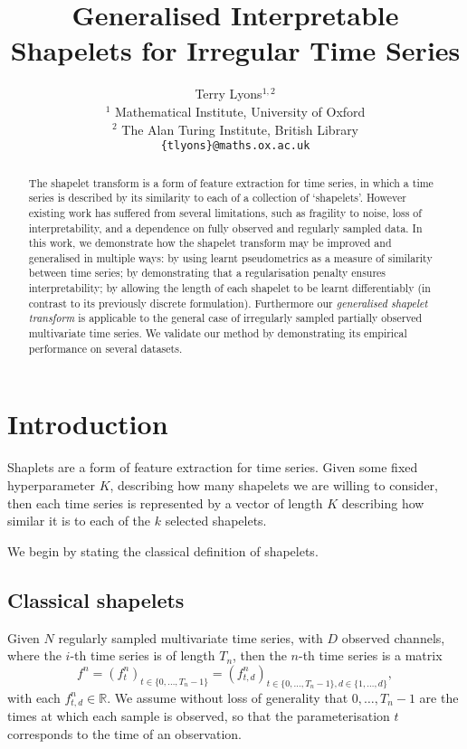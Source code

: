 \documentclass{article}
\title{Generalised Interpretable Shapelets for Irregular Time Series}
\author{
	\And
	Terry Lyons$^{1, 2}$
	\AND \\[-12pt]
	\null$^1$ Mathematical Institute, University of Oxford \\
	\null$^2$ The Alan Turing Institute, British Library \\
	\texttt{\{tlyons\}@\hspace{0.1pt}maths.ox.ac.uk}
}
\theoremstyle{plain}
\theoremstyle{definition}
\newcommand{\reals}{\mathbb{R}}
\begin{document}
	\maketitle
	\begin{abstract}
		The shapelet transform is a form of feature extraction for time series, in which a time series is described by its similarity to each of a collection of `shapelets'. However existing work has suffered from several limitations, such as fragility to noise, loss of interpretability, and a dependence on fully observed and regularly sampled data. In this work, we demonstrate how the shapelet transform may be improved and generalised in multiple ways: by using learnt pseudometrics as a measure of similarity between time series; by demonstrating that a regularisation penalty ensures interpretability; by allowing the length of each shapelet to be learnt differentiably (in contrast to its previously discrete formulation). Furthermore our \emph{generalised shapelet transform} is applicable to the general case of irregularly sampled partially observed multivariate time series. We validate our method by demonstrating its empirical performance on several datasets.
	\end{abstract}
	\section{Introduction}
	Shaplets are a form of feature extraction for time series. Given some fixed hyperparameter $K$, describing how many shapelets we are willing to consider, then each time series is represented by a vector of length $K$ describing how similar it is to each of the $k$ selected shapelets.
	
	We begin by stating the classical definition of shapelets.
	\subsection{Classical shapelets}
	Given $N$ regularly sampled multivariate time series, with $D$ observed channels, where the $i$-th time series is of length $T_n$, then the $n$-th time series is a matrix 
	\begin{equation}\label{eq:f-n}
	f^n = (f^n_{t})_{t \in \{0, \ldots, T_n - 1\}} = (f^n_{t, d})_{t \in \{0, \ldots, T_n - 1\}, d \in \{1, \ldots, d\}},
	\end{equation}
	with each $f^n_{t, d} \in \reals$. We assume without loss of generality that $0, \ldots, T_n - 1$ are the times at which each sample is observed, so that the parameterisation $t$ corresponds to the time of an observation.
	
\end{document}
